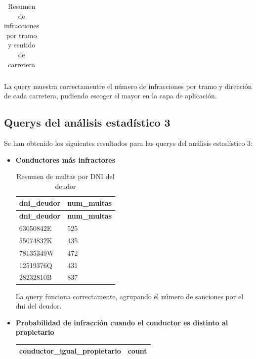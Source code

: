 \documentclass[]{article}
\begin{document}
\begin{itemize}
\begin{table}[H]
\begin{longtable}{l l l l}
\end{longtable}
\caption{Resumen de infracciones por tramo y sentido de carretera}
\end{table}

La query muestra correctamentre el número de infracciones por tramo y dirección de cada carretera, pudiendo escoger el mayor en la capa de aplicación.

\end{itemize}

\subsection{Querys del análisis estadístico 3}
Se han obtenido los siguientes resultados para las querys del análisis estadístico 3:

\begin{itemize}
    \item \textbf{Conductores más infractores}

\begin{table}[H]
\begin{longtable}{l l}
    \hline
    \textbf{dni\_deudor} & \textbf{num\_multas} \\ \hline
    \endfirsthead
    
    \hline
    \textbf{dni\_deudor} & \textbf{num\_multas} \\ \hline
    \endhead
    
    63050842E & 525 \\ \hline
    55074832K & 435 \\ \hline
    78135349W & 472 \\ \hline
    12519376Q & 431 \\ \hline
    28232810B & 837 \\ \hline
    
\end{longtable}
\caption{Resumen de multas por DNI del deudor}
\end{table}

La query funciona correctamente, agrupando el número de sanciones por el dni del deudor.

    \item \textbf{Probabilidad de infracción cuando el conductor es distinto al propietario}

\begin{table}[H]
\begin{longtable}{l l}
    \hline
    \textbf{conductor\_igual\_propietario} & \textbf{count} \\ \hline
    \endfirsthead
    

\end{longtable}
\end{table}
\end{itemize}
\end{document}
